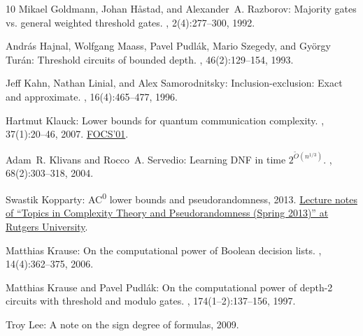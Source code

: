 \documentclass[11pt]{article}
\numberwithin{equation}{section}
\theoremstyle{definition}
\theoremstyle{plain}
\begin{document}
\begin{thebibliography}{10}
{\sc Mikael Goldmann, Johan H{\aa}stad, and Alexander~A. Razborov}: Majority
  gates {vs.} general weighted threshold gates.
, 2(4):277--300, 1992.
\newblock [\epfmtdoi{10.1007/BF01200426}]

{\sc Andr{\'{a}}s Hajnal, Wolfgang Maass, Pavel Pudl{\'{a}}k, Mario Szegedy,
  and Gy{\"{o}}rgy Tur{\'{a}}n}: Threshold circuits of bounded depth.
, 46(2):129--154, 1993.
\newblock [\epfmtdoi{10.1016/0022-0000(93)90001-D}]

{\sc Jeff Kahn, Nathan Linial, and Alex Samorodnitsky}: Inclusion-exclusion:
  {E}xact and approximate.
, 16(4):465--477, 1996.
\newblock [\epfmtdoi{10.1007/BF01271266}]

{\sc Hartmut Klauck}: Lower bounds for quantum communication complexity.
, 37(1):20--46, 2007.
\newblock \prelim \href{https://doi.org/10.1109/SFCS.2001.959903}{FOCS'01}.

{\sc Adam~R. Klivans and Rocco~A. Servedio}: Learning {DNF} in time
  {$2^{\tilde{O}(n^{1/3})}$}.
, 68(2):303--318, 2004.

{\sc Swastik Kopparty}: {AC}\textsuperscript{0} lower bounds and
  pseudorandomness, 2013.
\newblock
  \href{https://sites.math.rutgers.edu/~sk1233/courses/topics-S13/lec4.pdf}{Lecture
  notes of ``Topics in Complexity Theory and Pseudorandomness (Spring 2013)''
  at Rutgers University}.

{\sc Matthias Krause}: On the computational power of {B}oolean decision lists.
, 14(4):362--375, 2006.
\newblock [\epfmtdoi{10.1007/s00037-005-0203-0}]

{\sc Matthias Krause and Pavel Pudl{\'{a}}k}: On the computational power of
  depth-2 circuits with threshold and modulo gates.
, 174(1--2):137--156, 1997.
\newblock [\epfmtdoi{10.1016/S0304-3975(96)00019-9}]

{\sc Troy Lee}: A note on the sign degree of formulas, 2009.


\end{thebibliography}
\end{document}
